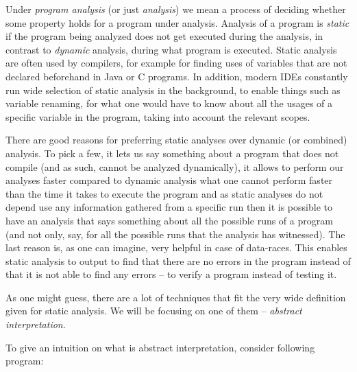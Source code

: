 \documentclass[..thesis.tex]{subfiles}
\begin{document}



Under \textit{program analysis} (or just \textit{analysis}) we mean a process of deciding whether some property holds for a program under analysis.
Analysis of a program is \textit{static} if the program being analyzed does not get executed during the analysis, in contrast to \textit{dynamic} analysis,
during what program is executed. Static analysis are often used by compilers, for example for finding uses of variables that are not declared beforehand
in Java or C programs. In addition, modern IDEs constantly run wide selection of static analysis in the background, to enable things such as variable renaming,
for what one would have to know about all the usages of a specific variable in the program, taking into account the relevant scopes. 



There are good reasons for preferring static analyses over dynamic (or combined) analysis.
To pick a few, it lets us say something about a program that does not compile (and as such, cannot be analyzed dynamically),
it allows to perform our analyses faster compared to dynamic analysis what one cannot perform faster than the time it takes to execute the program
and as static analyses do not depend use any information gathered from a specific run then it is possible to have an analysis that says something
about all the possible runs of a program (and not only, say, for all the possible runs that the analysis has witnessed).
The last reason is, as one can imagine, very helpful in case of data-races. This enables static analysis to output to find that there
 are no errors in the program instead of that it is not able to find any errors -- to verify a program instead of testing it.



As one might guess, there are a lot of techniques that fit the very wide definition given for static analysis. We will be focusing on one of them -- \textit{abstract interpretation}.



To give an intuition on what is abstract interpretation, consider following program:
\end{document}
